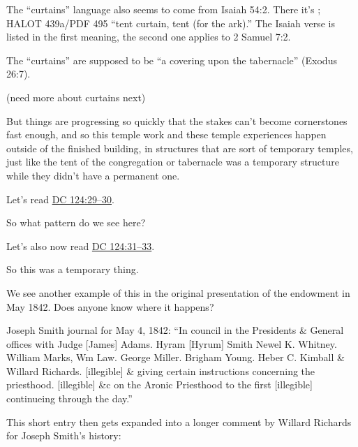 \begin{compactitem}
\begin{compactitem}
\begin{compactitem}
							\item The ``curtains'' language also seems to come from Isaiah 54:2. There it's ; HALOT 439a/PDF 495 ``tent curtain, tent (for the ark).'' The Isaiah verse is listed in the first meaning, the second one applies to 2 Samuel 7:2.
							\item The ``curtains'' are supposed to be ``a covering upon the tabernacle'' (Exodus 26:7).
							\item (need more about curtains next)
						\end{compactitem}
				\end{compactitem}
				
				
			\item But things are progressing so quickly that the stakes can't become cornerstones fast enough, and so this temple work and these temple experiences happen outside of the finished building, in structures that are sort of temporary temples, just like the tent of the congregation or tabernacle was a temporary structure while they didn't have a permanent one.
				\begin{compactitem}
					\item Let's read \hyperref[DC124-29]{DC 124:29--30}.
					\item So what pattern do we see here?
					\item Let's also now read \hyperref[DC124-31]{DC 124:31--33}.
					\item So this was a temporary thing.
					\item We see another example of this in the original presentation of the endowment in May 1842. Does anyone know where it happens?
					\item Joseph Smith journal for May 4, 1842: ``In council in the Presidents \& General offices with Judge [James] Adams. Hyram [Hyrum] Smith Newel K. Whitney. William Marks, Wm Law. George Miller. Brigham Young. Heber C. Kimball \& Willard Richards. [illegible] \& giving certain instructions concerning the priesthood. [illegible] \&c on the Aronic Priesthood to the first [illegible] continueing through the day.''
					\item This short entry then gets expanded into a longer comment by Willard Richards for Joseph Smith's history:
						\begin{compactitem}

\end{compactitem}
\end{compactitem}
\end{compactitem}
